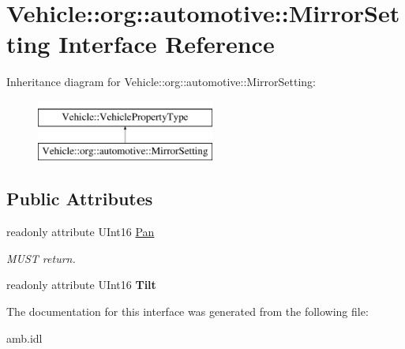 \hypertarget{interfaceVehicle_1_1org_1_1automotive_1_1MirrorSetting}{\section{Vehicle\-:\-:org\-:\-:automotive\-:\-:Mirror\-Setting Interface Reference}
\label{interfaceVehicle_1_1org_1_1automotive_1_1MirrorSetting}
}
Inheritance diagram for Vehicle\-:\-:org\-:\-:automotive\-:\-:Mirror\-Setting\-:\begin{figure}[H]
\begin{center}
\leavevmode
\includegraphics[height=2.000000cm]{interfaceVehicle_1_1org_1_1automotive_1_1MirrorSetting}
\end{center}
\end{figure}
\subsection*{Public Attributes}
\begin{DoxyCompactItemize}
\item 
\hypertarget{interfaceVehicle_1_1org_1_1automotive_1_1MirrorSetting_a000d0e712b912570aabecf35693fdd41}{readonly attribute U\-Int16 \hyperlink{interfaceVehicle_1_1org_1_1automotive_1_1MirrorSetting_a000d0e712b912570aabecf35693fdd41}{Pan}}\label{interfaceVehicle_1_1org_1_1automotive_1_1MirrorSetting_a000d0e712b912570aabecf35693fdd41}

\begin{DoxyCompactList}\small\item\em M\-U\-S\-T return. \end{DoxyCompactList}\item 
\hypertarget{interfaceVehicle_1_1org_1_1automotive_1_1MirrorSetting_a2a265c271b7c331f37918dbd7419c7bd}{readonly attribute U\-Int16 {\bfseries Tilt}}\label{interfaceVehicle_1_1org_1_1automotive_1_1MirrorSetting_a2a265c271b7c331f37918dbd7419c7bd}

\end{DoxyCompactItemize}


The documentation for this interface was generated from the following file\-:\begin{DoxyCompactItemize}
\item 
amb.\-idl\end{DoxyCompactItemize}
